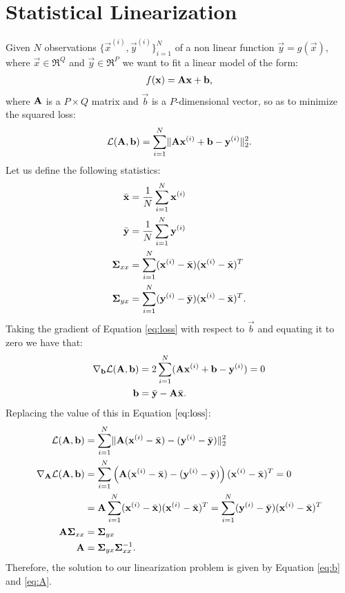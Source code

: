 \documentclass[11pt,a4paper]{article}
\newcommand{\x}{\vec{x}}
\newcommand{\y}{\vec{y}}
\renewcommand{\xi}{\x^{(i)}}
\newcommand{\yi}{\y^{(i)}}
\renewcommand{\b}{\vec{b}}
\newcommand{\xbar}{\bar{\x}}
\newcommand{\ybar}{\bar{\y}}
\newcommand{\Sigmaxx}{\mat{\Sigma}_{xx}}
\newcommand{\Sigmayx}{\mat{\Sigma}_{yx}}
\newcommand{\grad}{\nabla}
\newcommand{\loss}{\calL(\A,\b)}
\renewcommand{\Q}{Q}
\renewcommand{\P}{P}
\begin{document}
\section{Statistical Linearization}
Given $N$ observations $\{ \xi, \yi\}_{i=1}^N$ of a non linear function $\y = g(\x)$, where 
$\x \in \Re^\Q$ and $\y \in \Re^\P$ we want to fit a linear model of the form:
\begin{align}
	f(\x) = \A \x + \b \text{,}
\end{align}
where $\mathbf{A}$ is a $\P \times  \Q$ matrix and $\b$ is a $\P$-dimensional vector, so as to 
minimize the squared loss:
\begin{align}
	\label{eq:loss}
	\loss = \sum_{i=1}^N \norm{\A \xi + \b - \yi }_2^2 \text{.}
\end{align}
Let us define the following statistics:
\begin{align}
	\xbar & = \frac{1}{N} \sum_{i=1}^N \xi \\
	\ybar & = \frac{1}{N} \sum_{i=1}^N \yi \\
	\Sigmaxx & = \sum_{i=1}^N (\xi - \xbar) (\xi - \xbar)^T \\
	\Sigmayx & = \sum_{i=1}^N (\yi - \ybar) (\xi - \xbar)^T \text{.}
\end{align}
Taking the gradient of Equation \eqref{eq:loss} with respect to $\b$  and equating it to zero we have that:
\begin{align}
	\grad_{\b} \loss &= 2 \sum_{i=1}^N ( \A \xi + \b - \yi )   = 0 \\
	\label{eq:b}
		\b & = \ybar - \A \xbar \text{.}
\end{align}
Replacing the value of this in Equation $\eqref{eq:loss}$:
\begin{align}
	\loss &= \sum_{i=1}^N \norm{\A (\xi  -\xbar) -  (\yi - \ybar) }_2^2 \\
	\grad_{\A} \loss & =\sum_{i=1}^N \left(\A (\xi  -\xbar) -  (\yi - \ybar) \right) (\xi  -\xbar)^T = 0 \\	
	& = \A \sum_{i=1}^N (\xi  -\xbar)  (\xi  -\xbar)^T = \sum_{i=1}^N (\yi - \ybar)  (\xi  -\xbar)^T \\
	\A \Sigmaxx & = \Sigmayx \\
		\label{eq:A}
	\A & =  \Sigmayx  \Sigmaxx^{-1} \text{.}
\end{align}
Therefore, the solution to our linearization problem is given by Equation \eqref{eq:b} and
\eqref{eq:A}. 
\end{document}
